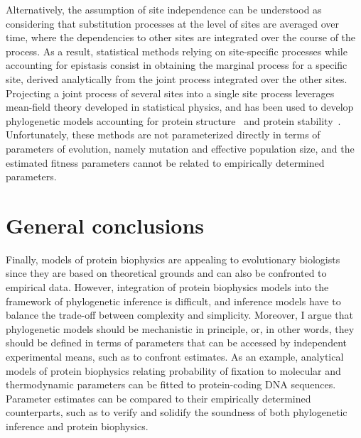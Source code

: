 Alternatively, the assumption of site independence can be understood as considering that \gls{substitution} processes at the level of sites are averaged over time, where the dependencies to other sites are integrated over the course of the process.
As a result, statistical methods relying on site-specific processes while accounting for epistasis consist in obtaining the marginal process for a specific site, derived analytically from the joint process integrated over the other sites.
Projecting a joint process of several sites into a single site process leverages mean-field theory developed in statistical physics, and has been used to develop phylogenetic models accounting for protein structure~\citep{Chi2018} and protein stability~\citep{Arenas2015a, Arenas2017}.
Unfortunately, these methods are not parameterized directly in terms of parameters of evolution, namely mutation and \gls{effective population size}, and the estimated fitness parameters cannot be related to empirically determined parameters.

\section{General conclusions}

Finally, models of protein biophysics are appealing to evolutionary biologists since they are based on theoretical grounds and can also be confronted to empirical data.
However, integration of protein biophysics models into the framework of phylogenetic inference is difficult, and inference models have to balance the trade-off between complexity and simplicity.
Moreover, I argue that phylogenetic models should be mechanistic in principle, or, in other words, they should be defined in terms of parameters that can be accessed by independent experimental means, such as to confront estimates.
As an example, analytical models of protein biophysics relating probability of fixation to molecular and thermodynamic parameters can be fitted to protein-coding \acrshort{DNA} sequences.
Parameter estimates can be compared to their empirically determined counterparts, such as to verify and solidify the soundness of both phylogenetic inference and protein biophysics.
